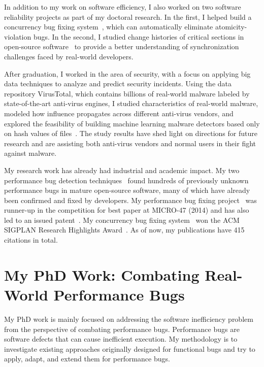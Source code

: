 \documentclass[10pt]{article}
\begin{document}
In addition to my work on software efficiency, I also worked on two software reliability projects as part of my doctoral research. In the first, 
I helped build a concurrency bug fixing system~\cite{jin11afix}, 
which can automatically eliminate atomicity-violation bugs.
In the second, I studied change histories of critical sections in open-source software~\cite{Gu15FSE} 
to provide a better understanding of synchronization challenges faced by real-world developers. 

After graduation, I worked in the area of security, 
with a focus on applying big data techniques to analyze and predict security incidents. 
Using the data repository VirusTotal, 
which contains billions of real-world malware labeled by state-of-the-art anti-virus engines, 
I studied characteristics of real-world malware, 
modeled how influence propagates across different anti-virus vendors, 
and explored the feasibility of building machine learning malware detectors based only on hash values of files~\cite{Song16ApSys,Song17EuroSys}. 
The study results have shed light on directions for future research  
and are assisting both anti-virus vendors and normal users in their fight against malware.

My research work has already had industrial and academic impact. 
My two performance bug detection techniques~\cite{jin12perfbug, Nistor13ICSE} 
found hundreds of previously unknown performance bugs in mature open-source software, 
many of which have already been confirmed and fixed by developers. 
My performance bug fixing project~\cite{Song14MICRO} was runner-up in the competition for best paper at MICRO-47 (2014)
and has also led to an issued patent~\cite{comppatent}.
My concurrency bug fixing system~\cite{jin11afix} won the ACM SIGPLAN Research Highlights Award~\cite{afixnom}. 
As of now, my publications have 415 citations in total. 

\vspace{-.1in}
\section{My PhD Work: Combating Real-World Performance Bugs}

My PhD work is mainly focused on addressing the software 
inefficiency problem from the perspective of combating performance bugs. 
Performance bugs are software defects that can cause inefficient execution. 
My methodology is to investigate existing approaches originally designed for functional bugs
and try to apply, adapt, and extend them for performance bugs. 
\end{document}
